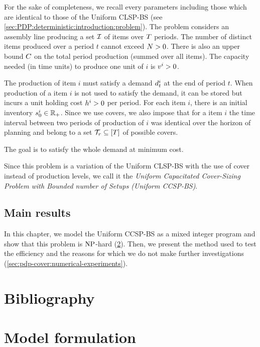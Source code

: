 For the sake of completeness, we recall every parameters including those which are identical to those of the Uniform CLSP-BS (see \cref{sec:PDP:deterministic:introduction:problem}).
The problem considers an assembly line producing a set $\mathcal{I}$ of items over $T$ periods.
The number of distinct items produced over a period $t$ cannot exceed $N>0$.
There is also an upper bound $C$ on the total period production (summed over all items).
The capacity needed (in time units) to produce one unit of $i$ is $v^i>0$.


The production of item $i$ must satisfy a demand $d_t^i$ at the end of period $t$.
When production of a item $i$ is not used to satisfy the demand, it can be stored but incurs a unit holding cost $h^i>0$ per period.
For each item $i$, there is an initial inventory $s_0^i\in\mathbb{R}_+$.
Since we use covers, we also impose that for a item $i$ the time interval between two periods of production of $i$ was identical over the horizon of planning and belong to a set $\coverset_r\subseteq\range{\horizon}$ of possible covers.


The goal is to satisfy the whole demand at minimum cost.


Since this problem is a variation of the Uniform CLSP-BS with the use of cover instead of production levels, we call it the \emph{Uniform Capacitated Cover-Sizing Problem with Bounded number of Setups (Uniform CCSP-BS)}.



\subsection{Main results}


In this chapter, we model the Uniform CCSP-BS as a mixed integer program and show that this problem is $\operatorname{NP}$-hard (\cref{sec:pdp-cover:model-formulation}).
Then, we present the method used to test the efficiency and the reasons for which we do not make further investigations (\cref{sec:pdp-cover:numerical-experiments}).



\section{Bibliography}




\section{Model formulation}
\label{sec:pdp-cover:model-formulation}

